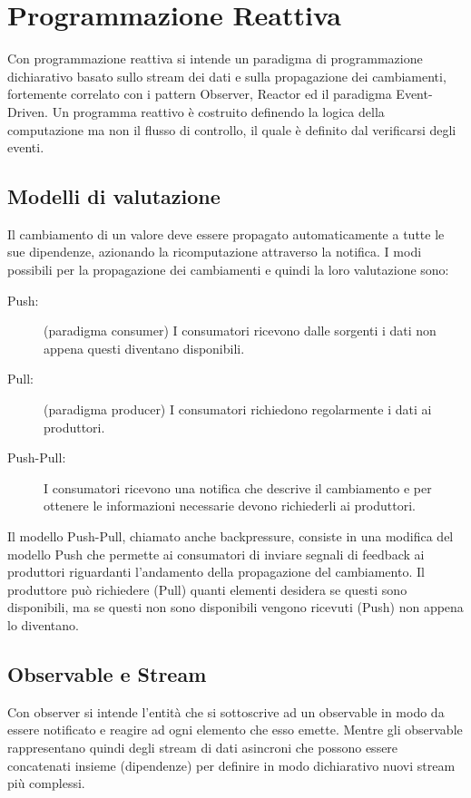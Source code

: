 \documentclass[../main.tex]{subfiles}
\begin{document}
\section{Programmazione Reattiva}
Con programmazione reattiva si intende un paradigma di programmazione dichiarativo basato sullo stream dei dati e sulla propagazione dei cambiamenti, fortemente correlato con i pattern Observer, Reactor ed il paradigma Event-Driven.
Un programma reattivo è costruito definendo la logica della computazione ma non il flusso di controllo, il quale è definito dal verificarsi degli eventi.

\subsection{Modelli di valutazione}
Il cambiamento di un valore deve essere propagato automaticamente a tutte le sue dipendenze, azionando la ricomputazione attraverso la notifica. I modi possibili per la propagazione dei cambiamenti e quindi la loro valutazione sono:
\begin{description}
    \item[Push:] (paradigma consumer) I consumatori ricevono dalle sorgenti i dati non appena questi diventano disponibili. 
    \item[Pull:] (paradigma producer) I consumatori richiedono regolarmente i dati ai produttori.
    \item[Push-Pull:] I consumatori ricevono una notifica che descrive il cambiamento e per ottenere le informazioni necessarie devono richiederli ai produttori.
\end{description}
Il modello Push-Pull, chiamato anche backpressure, consiste in una modifica del modello Push che permette ai consumatori di inviare segnali di feedback ai produttori riguardanti l'andamento della propagazione del cambiamento. Il produttore può richiedere (Pull) quanti elementi desidera se questi sono disponibili, ma se questi non sono disponibili vengono ricevuti (Push) non appena lo diventano.

\subsection{Observable e Stream}
Con observer si intende l'entità che si sottoscrive ad un observable in modo da essere notificato e reagire ad ogni elemento che esso emette. Mentre gli observable rappresentano quindi degli stream di dati asincroni che possono essere concatenati insieme (dipendenze) per definire in modo dichiarativo nuovi stream più complessi.
\end{document}
